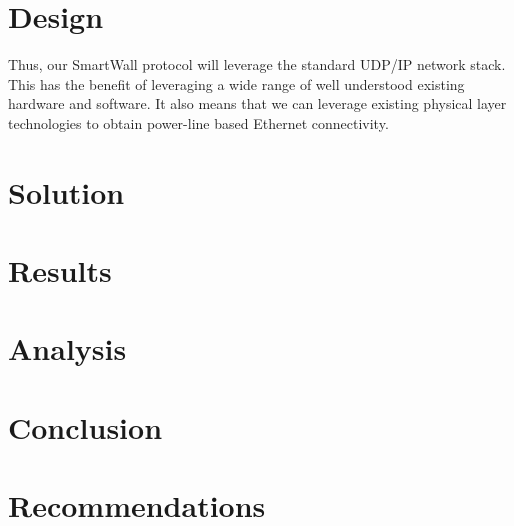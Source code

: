 \documentclass[12pt]{article}
\begin{document}
\section{Design}

Thus, our SmartWall protocol will
leverage the standard UDP/IP network stack.
This has the benefit of
leveraging a wide range of well understood existing hardware and
software. It also means that we can leverage existing physical layer
technologies to obtain power-line based Ethernet connectivity.

\section{Solution}



\section{Results}


\section{Analysis}


\section{Conclusion}


\section{Recommendations}
\end{document}
